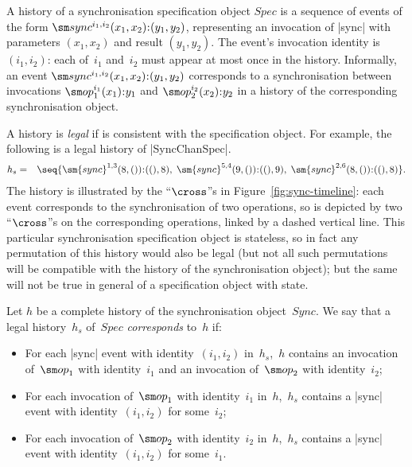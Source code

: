 A history of a synchronisation specification object $Spec$ is a sequence of
events of the form $\sync^{i_1, i_2}(x_1, x_2)\:: (y_1, y_2)$, representing an
invocation of |sync| with parameters $(x_1, x_2)$ and result $(y_1,y_2)$.  The
event's invocation identity is~$(i_1,i_2)$: each of~$i_1$ and~$i_2$ must
appear at most once in the history.  Informally, an event $\sync^{i_1,
  i_2}(x_1, x_2)\:: (y_1, y_2)$ corresponds to a synchronisation between
invocations $\op_1^{i_1}(x_1)\::y_1$ and $\op_2^{i_2}(x_2)\::y_2$ in a history
of the corresponding synchronisation object.

A history is \emph{legal} if is consistent with the specification object.  
%
For example, the following is a legal history of |SyncChanSpec|.
\begin{eqnarray*}
h_s & = & 
\seq{
 \sm{sync}^{1,3}(8,()) \:: ((), 8), \;
 \sm{sync}^{5,4}(9,()) \:: ((), 9), \;
 \sm{sync}^{2,6}(8,()) \:: ((), 8) } .
\end{eqnarray*}
The history is illustrated by the ``$\cross$''s in
Figure~\ref{fig:sync-timeline}: each event corresponds to the synchronisation
of two operations, so is depicted by two ``$\cross$''s on the corresponding
operations, linked by a dashed vertical line.  This particular synchronisation
specification object is stateless, so in fact any permutation of this history
would also be legal (but not all such permutations will be compatible with the
history of the synchronisation object); but the same will not be true in
general of a specification object with state.

Let $h$ be a complete history of the synchronisation object~$Sync$.  We say
that a legal history~$h_s$ of~$Spec$ \emph{corresponds} to~$h$ if:
%
\begin{itemize}
\item For each |sync| event with identity~$(i_1,i_2)$ in~$h_s$,\, $h$ contains
  an invocation of~$\op_1$ with identity~$i_1$ and an invocation of~$\op_2$ with
  identity~$i_2$;

\item For each invocation of~$\op_1$ with identity~$i_1$ in~$h$,\, $h_s$
  contains a |sync| event with identity~$(i_1,i_2)$ for some~$i_2$;

\item For each invocation of~$\op_2$ with identity~$i_2$ in~$h$,\, $h_s$
  contains a |sync| event with identity~$(i_1,i_2)$ for some~$i_1$.
\end{itemize}
%

